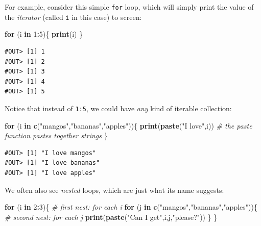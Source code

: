 \documentclass[]{book}
\newenvironment{Shaded}{\begin{snugshade}}{\end{snugshade}}
\newcommand{\CommentTok}[1]{\textcolor[rgb]{0.56,0.35,0.01}{\textit{#1}}}
\newcommand{\ControlFlowTok}[1]{\textcolor[rgb]{0.13,0.29,0.53}{\textbf{#1}}}
\newcommand{\DecValTok}[1]{\textcolor[rgb]{0.00,0.00,0.81}{#1}}
\newcommand{\KeywordTok}[1]{\textcolor[rgb]{0.13,0.29,0.53}{\textbf{#1}}}
\newcommand{\NormalTok}[1]{#1}
\newcommand{\OperatorTok}[1]{\textcolor[rgb]{0.81,0.36,0.00}{\textbf{#1}}}
\newcommand{\StringTok}[1]{\textcolor[rgb]{0.31,0.60,0.02}{#1}}
\begin{document}
For example, consider this simple \texttt{for} loop, which will simply print the value of the \emph{iterator} (called \texttt{i} in this case) to screen:

\begin{Shaded}
\begin{Highlighting}[]
\ControlFlowTok{for}\NormalTok{ (i }\ControlFlowTok{in} \DecValTok{1}\OperatorTok{:}\DecValTok{5}\NormalTok{)\{}
  \KeywordTok{print}\NormalTok{(i)}
\NormalTok{\}}
\end{Highlighting}
\end{Shaded}

\begin{verbatim}
#OUT> [1] 1
#OUT> [1] 2
#OUT> [1] 3
#OUT> [1] 4
#OUT> [1] 5
\end{verbatim}

Notice that instead of \texttt{1:5}, we could have \emph{any} kind of iterable collection:

\begin{Shaded}
\begin{Highlighting}[]
\ControlFlowTok{for}\NormalTok{ (i }\ControlFlowTok{in} \KeywordTok{c}\NormalTok{(}\StringTok{"mangos"}\NormalTok{,}\StringTok{"bananas"}\NormalTok{,}\StringTok{"apples"}\NormalTok{))\{}
  \KeywordTok{print}\NormalTok{(}\KeywordTok{paste}\NormalTok{(}\StringTok{"I love"}\NormalTok{,i))  }\CommentTok{# the paste function pastes together strings}
\NormalTok{\}}
\end{Highlighting}
\end{Shaded}

\begin{verbatim}
#OUT> [1] "I love mangos"
#OUT> [1] "I love bananas"
#OUT> [1] "I love apples"
\end{verbatim}

We often also see \emph{nested} loops, which are just what its name suggests:

\begin{Shaded}
\begin{Highlighting}[]
\ControlFlowTok{for}\NormalTok{ (i }\ControlFlowTok{in} \DecValTok{2}\OperatorTok{:}\DecValTok{3}\NormalTok{)\{}
  \CommentTok{# first nest: for each i}
  \ControlFlowTok{for}\NormalTok{ (j }\ControlFlowTok{in} \KeywordTok{c}\NormalTok{(}\StringTok{"mangos"}\NormalTok{,}\StringTok{"bananas"}\NormalTok{,}\StringTok{"apples"}\NormalTok{))\{}
    \CommentTok{# second nest: for each j}
    \KeywordTok{print}\NormalTok{(}\KeywordTok{paste}\NormalTok{(}\StringTok{"Can I get"}\NormalTok{,i,j,}\StringTok{"please?"}\NormalTok{))}
\NormalTok{  \}}
\NormalTok{\}}
\end{Highlighting}
\end{Shaded}
\end{document}
